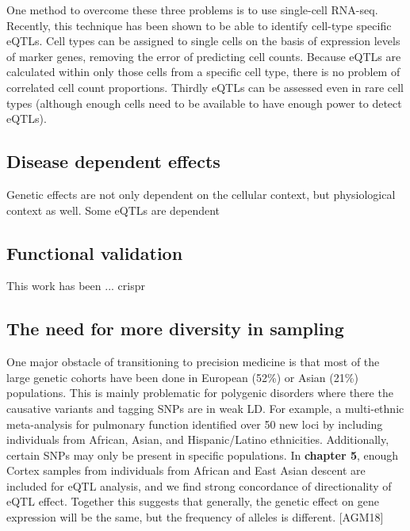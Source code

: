 One method to overcome these three problems is to use single-cell RNA-seq\cite{tangMRNASeqWholetranscriptomeAnalysis2009}. Recently, this technique has been shown to be able to identify cell-type specific eQTLs\cite{vanderwijstSinglecellRNASequencing2018b}. Cell types can be assigned to single cells on the basis of expression levels of marker genes, removing the error of predicting cell counts. Because eQTLs are calculated within only those cells from a specific cell type, there is no problem of correlated cell count proportions. Thirdly eQTLs can be assessed even in rare cell types (although enough cells need to be available to have enough power to detect eQTLs).

\subsection{Disease dependent effects}
Genetic effects are not only dependent on the cellular context, but physiological context as well. Some eQTLs are dependent 

\subsection{Functional validation}
This work has been ... crispr

\subsection{The need for more diversity in sampling}
One major obstacle of transitioning to precision medicine is that most of the large genetic cohorts have been done in European (52\%) or Asian (21\%) populations\cite{sirugoMissingDiversityHuman2019}. This is mainly problematic for polygenic disorders where there the causative variants and tagging SNPs are in weak LD\cite{sirugoMissingDiversityHuman2019}. For example, a multi-ethnic meta-analysis for pulmonary function identified over 50 new loci by including individuals from African, Asian, and Hispanic/Latino ethnicities\cite{wyssMultiethnicMetaanalysisIdentifies2018}.  Additionally, certain SNPs may only be present in specific populations\cite{adalsteinsdottirberglindNationwideStudyHypertrophic2014}.  In \textbf{chapter 5}, enough Cortex samples from individuals from African and East Asian descent are included for eQTL analysis, and we find strong concordance of directionality of eQTL effect. Together this suggests that generally, the genetic effect on gene expression will be the same, but the frequency of alleles is different. 
[AGM18]
